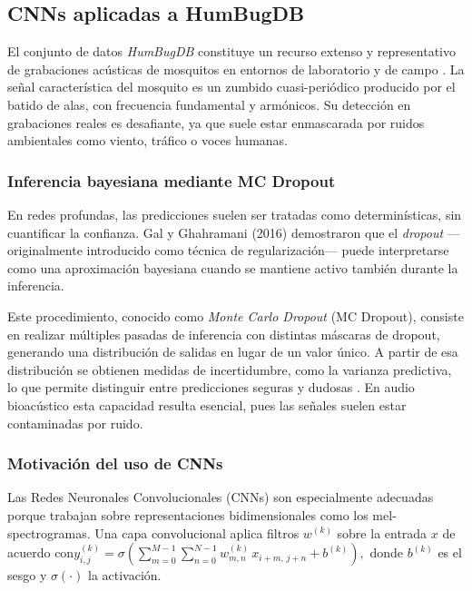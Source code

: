 \subsection{CNNs aplicadas a HumBugDB}
\label{sec:dl_cnn}

El conjunto de datos \emph{HumBugDB} constituye un recurso extenso y representativo de grabaciones acústicas de mosquitos en entornos de laboratorio y de campo \cite{HumBugDB}.  
La señal característica del mosquito es un zumbido cuasi-periódico producido por el batido de alas, con frecuencia fundamental y armónicos.  
Su detección en grabaciones reales es desafiante, ya que suele estar enmascarada por ruidos ambientales como viento, tráfico o voces humanas.

\subsubsection*{Inferencia bayesiana mediante MC Dropout}

En redes profundas, las predicciones suelen ser tratadas como determinísticas, sin cuantificar la confianza.  
Gal y Ghahramani (2016) demostraron que el \emph{dropout} —originalmente introducido como técnica de regularización— puede interpretarse como una aproximación bayesiana cuando se mantiene activo también durante la inferencia.  

Este procedimiento, conocido como \emph{Monte Carlo Dropout} (MC Dropout), consiste en realizar múltiples pasadas de inferencia con distintas máscaras de dropout, generando una distribución de salidas en lugar de un valor único.  
A partir de esa distribución se obtienen medidas de incertidumbre, como la varianza predictiva, lo que permite distinguir entre predicciones seguras y dudosas \cite{GalGhahramani2016}.  
En audio bioacústico esta capacidad resulta esencial, pues las señales suelen estar contaminadas por ruido.

\subsubsection{Motivación del uso de CNNs}

Las Redes Neuronales Convolucionales (CNNs) son especialmente adecuadas porque trabajan sobre representaciones bidimensionales como los mel-spectrogramas.  
Una capa convolucional aplica filtros $w^{(k)}$ sobre la entrada $x$ de acuerdo con\(
y_{i,j}^{(k)} = \sigma \!\left( \sum_{m=0}^{M-1}\sum_{n=0}^{N-1} 
w_{m,n}^{(k)} \, x_{i+m,\,j+n} + b^{(k)} \right),
\) donde $b^{(k)}$ es el sesgo y $\sigma(\cdot)$ la activación.  


